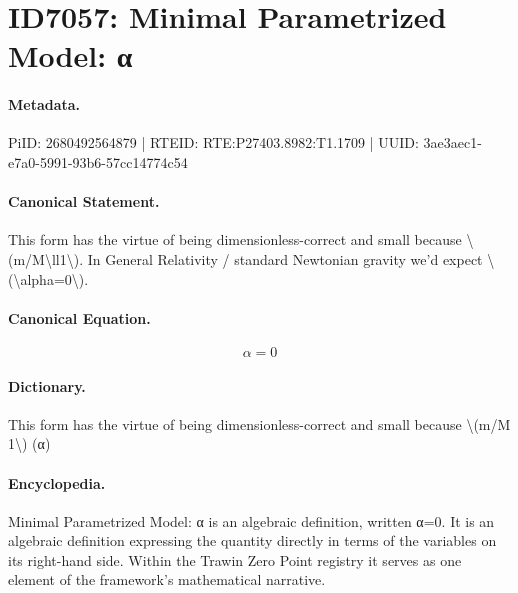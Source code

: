 \section*{ID7057: Minimal Parametrized Model: α}
\paragraph{Metadata.}
PiID: 2680492564879 | RTEID: RTE:P27403.8982:T1.1709 | UUID: 3ae3aec1-e7a0-5991-93b6-57cc14774c54

\paragraph{Canonical Statement.}
This form has the virtue of being dimensionless-correct and small because \textbackslash{}(m/M\textbackslash{}ll1\textbackslash{}). In General Relativity / standard Newtonian gravity we'd expect \textbackslash{}(\textbackslash{}alpha=0\textbackslash{}).

\paragraph{Canonical Equation.}
\[
\alpha=0
\]

\paragraph{Dictionary.}
This form has the virtue of being dimensionless-correct and small because \textbackslash{}(m/M 1\textbackslash{}) (α)

\paragraph{Encyclopedia.}
Minimal Parametrized Model: α is an algebraic definition, written α=0. It is an algebraic definition expressing the quantity directly in terms of the variables on its right-hand side. Within the Trawin Zero Point registry it serves as one element of the framework's mathematical narrative.

